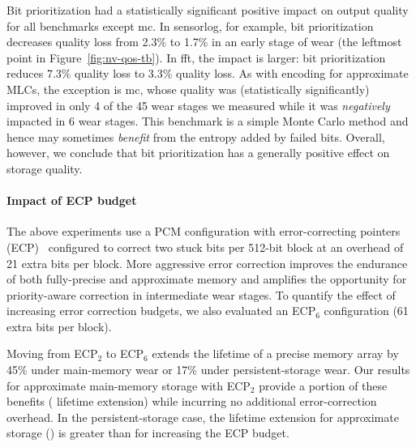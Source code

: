 \documentclass[prodmode,acmtocs]{acmsmall}
\begin{document}
Bit prioritization had a statistically significant positive impact on output
quality for all benchmarks except \textsf{mc}. In \textsf{sensorlog}, for example, bit
prioritization decreases quality loss from 2.3\% to 1.7\% in an early stage of
wear (the leftmost point in Figure~\ref{fig:nv-qos-tb}). In \textsf{fft}, the
impact is larger: bit prioritization reduces 7.3\% quality loss to
3.3\% quality loss. As with encoding for approximate MLCs, the exception is \textsf{mc}, whose quality was
(statistically significantly) improved in
only 4 of the 45 wear stages we measured while it was \emph{negatively}
impacted in 6 wear stages. This benchmark is a simple Monte Carlo method
and hence may sometimes \emph{benefit} from the entropy added by failed bits.
Overall, however, we conclude that bit prioritization has a generally positive
effect on storage quality.

\paragraph{Impact of ECP budget} The above experiments use a PCM configuration
with error-correcting pointers (ECP)~\cite{ecp} configured to correct two stuck
bits per 512-bit block at an overhead of 21 extra bits per block. More
aggressive error correction improves the endurance of both fully-precise and
approximate memory and amplifies the opportunity for priority-aware
correction in intermediate wear stages. To quantify the effect of increasing
error correction budgets, we also evaluated an ECP$_6$ configuration (61 extra
bits per block).

Moving from ECP$_2$ to ECP$_6$ extends the lifetime of a precise memory array
by 45\% under main-memory wear or 17\% under persistent-storage wear.
Our
results for approximate main-memory storage with ECP$_2$ provide a
portion of these benefits ( lifetime extension) while incurring no
additional error-correction overhead. In the persistent-storage case, the
lifetime extension for approximate storage () is greater than for
increasing the ECP budget.


\end{document}
